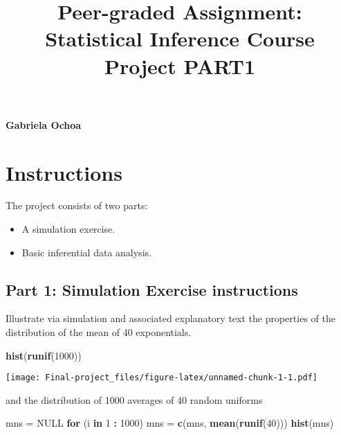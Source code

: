 \documentclass[]{article}
\title{Peer-graded Assignment: Statistical Inference Course Project PART1}
\author{}
\date{\vspace{-2.5em}}
\newenvironment{Shaded}{\begin{snugshade}}{\end{snugshade}}
\newcommand{\KeywordTok}[1]{\textcolor[rgb]{0.13,0.29,0.53}{\textbf{#1}}}
\newcommand{\DecValTok}[1]{\textcolor[rgb]{0.00,0.00,0.81}{#1}}
\newcommand{\StringTok}[1]{\textcolor[rgb]{0.31,0.60,0.02}{#1}}
\newcommand{\OtherTok}[1]{\textcolor[rgb]{0.56,0.35,0.01}{#1}}
\newcommand{\ControlFlowTok}[1]{\textcolor[rgb]{0.13,0.29,0.53}{\textbf{#1}}}
\newcommand{\OperatorTok}[1]{\textcolor[rgb]{0.81,0.36,0.00}{\textbf{#1}}}
\newcommand{\NormalTok}[1]{#1}
\providecommand{\tightlist}{%
  \setlength{\itemsep}{0pt}\setlength{\parskip}{0pt}}
\let\oldparagraph\paragraph
\renewcommand{\paragraph}[1]{\oldparagraph{#1}\mbox{}}
\begin{document}
\maketitle

\paragraph{Gabriela Ochoa}\label{gabriela-ochoa}

\section{\texorpdfstring{\textbf{Instructions}}{Instructions}}\label{instructions}

The project consists of two parts:

\begin{itemize}
\tightlist
\item
  A simulation exercise.
\item
  Basic inferential data analysis.
\end{itemize}

\subsection{\texorpdfstring{\textbf{Part 1: Simulation Exercise
instructions}}{Part 1: Simulation Exercise instructions}}\label{part-1-simulation-exercise-instructions}

Illustrate via simulation and associated explanatory text the properties
of the distribution of the mean of 40 exponentials.

\begin{Shaded}
\begin{Highlighting}[]
\KeywordTok{hist}\NormalTok{(}\KeywordTok{runif}\NormalTok{(}\DecValTok{1000}\NormalTok{))}
\end{Highlighting}
\end{Shaded}

\texttt{[image: Final-project\_files/figure-latex/unnamed-chunk-1-1.pdf]}

and the distribution of 1000 averages of 40 random uniforms

\begin{Shaded}
\begin{Highlighting}[]
\NormalTok{mns =}\StringTok{ }\OtherTok{NULL}
\ControlFlowTok{for}\NormalTok{ (i }\ControlFlowTok{in} \DecValTok{1} \OperatorTok{:}\StringTok{ }\DecValTok{1000}\NormalTok{) mns =}\StringTok{ }\KeywordTok{c}\NormalTok{(mns, }\KeywordTok{mean}\NormalTok{(}\KeywordTok{runif}\NormalTok{(}\DecValTok{40}\NormalTok{)))}
\KeywordTok{hist}\NormalTok{(mns)}
\end{Highlighting}
\end{Shaded}
\end{document}
